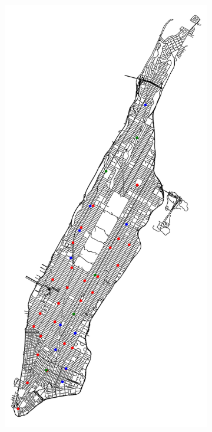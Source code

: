 \begin{figure}[tbh]
	\centering
	\begin{subfigure}[b]{0.32\textwidth}
		\centering
		\includegraphics[width=\textwidth]{assets/img/new_york_vanilla_info.png}

\end{subfigure}
\end{figure}

